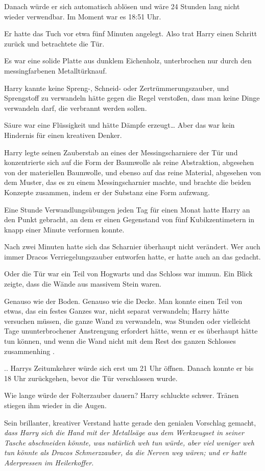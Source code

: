 {Danach würde er sich automatisch ablösen und wäre 24 Stunden lang nicht wieder verwendbar. Im Moment war es 18:51 Uhr.

Er hatte das Tuch vor etwa fünf Minuten angelegt. Also trat Harry einen Schritt zurück und betrachtete die Tür.

Es war eine solide Platte aus dunklem Eichenholz, unterbrochen nur durch den messingfarbenen Metalltürknauf.

Harry kannte keine Spreng-, Schneid- oder Zertrümmerungszauber, und Sprengstoff zu verwandeln hätte gegen die Regel verstoßen, dass man keine Dinge verwandeln darf, die verbrannt werden sollen.

Säure war eine Flüssigkeit und hätte Dämpfe erzeugt… Aber das war kein Hindernis für einen kreativen Denker.

Harry legte seinen Zauberstab an eines der Messingscharniere der Tür und konzentrierte sich auf die Form der Baumwolle als reine Abstraktion, abgesehen von der materiellen Baumwolle, und ebenso auf das reine Material, abgesehen von dem Muster, das es zu einem Messingscharnier machte, und brachte die beiden Konzepte zusammen, indem er der Substanz eine Form aufzwang.

Eine Stunde Verwandlungsübungen jeden Tag für einen Monat hatte Harry an den Punkt gebracht, an dem er einen Gegenstand von fünf Kubikzentimetern in knapp einer Minute verformen konnte.

Nach zwei Minuten hatte sich das Scharnier überhaupt nicht verändert. Wer auch immer Dracos Verriegelungszauber entworfen hatte, er hatte auch an das gedacht.

Oder die Tür war ein Teil von Hogwarts und das Schloss war immun. Ein Blick zeigte, dass die Wände aus massivem Stein waren.

Genauso wie der Boden. Genauso wie die Decke. Man konnte einen Teil von etwas, das ein festes Ganzes war, nicht separat verwandeln; Harry hätte versuchen müssen, die ganze Wand zu verwandeln, was Stunden oder vielleicht Tage ununterbrochener Anstrengung erfordert hätte, wenn er es überhaupt hätte tun können, und wenn die Wand nicht mit dem Rest des ganzen Schlosses zusammenhing .

.. Harrys Zeitumkehrer würde sich erst um 21 Uhr öffnen. Danach konnte er bis 18 Uhr zurückgehen, bevor die Tür verschlossen wurde.

Wie lange würde der Folterzauber dauern? Harry schluckte schwer. Tränen stiegen ihm wieder in die Augen.

Sein brillanter, kreativer Verstand hatte gerade den genialen Vorschlag gemacht, \emph{dass Harry sich die Hand mit der Metallsäge aus dem Werkzeugset in seiner Tasche abschneiden könnte, was natürlich weh tun würde, aber viel weniger weh tun könnte als Dracos Schmerzzauber, da die Nerven weg wären; und er hatte Aderpressen im Heilerkoffer.}

}
